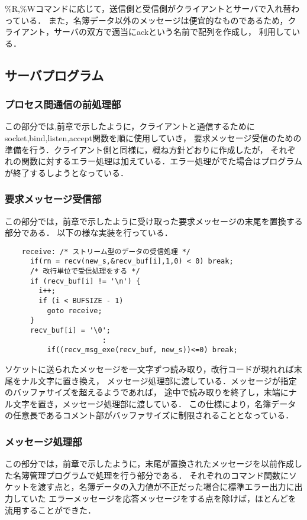 \documentclass[a4paper,11pt]{jarticle}
\begin{document}
\%R,\%Wコマンドに応じて，送信側と受信側がクライアントとサーバで入れ替わっている．
また，名簿データ以外のメッセージは便宜的なものであるため，クライアント，サーバの双方で適当にackという名前で配列を作成し，
利用している．

\subsection{サーバプログラム}
\subsubsection{プロセス間通信の前処理部} \label{sec:pre}
この部分では,前章で示したように，クライアントと通信するためにsocket,bind,listen,accept関数を順に使用していき，
要求メッセージ受信のための準備を行う．クライアント側と同様に，概ね方針どおりに作成したが，
それぞれの関数に対するエラー処理は加えている．エラー処理がでた場合はプログラムが終了するしようとなっている．
\subsubsection{要求メッセージ受信部} \label{sec:pre}
この部分では，前章で示したように受け取った要求メッセージの末尾を置換する部分である．
以下の様な実装を行っている．
\begin{verbatim}
	receive: /* ストリーム型のデータの受信処理 */  
	  if(rn = recv(new_s,&recv_buf[i],1,0) < 0) break;
	  /* 改行単位で受信処理をする */
	  if (recv_buf[i] != '\n') {
	    i++;
	    if (i < BUFSIZE - 1)
	      goto receive;
	  }
	  recv_buf[i] = '\0';
                       :
          if((recv_msg_exe(recv_buf, new_s))<=0) break;
\end{verbatim}
ソケットに送られたメッセージを一文字ずつ読み取り，改行コードが現れれば末尾をナル文字に置き換え，
メッセージ処理部に渡している．メッセージが指定のバッファサイズを超えるようであれば，
途中で読み取りを終了し，末端にナル文字を置き，メッセージ処理部に渡している．
この仕様により，名簿データの任意長であるコメント部がバッファサイズに制限されることとなっている．
\subsubsection{メッセージ処理部} \label{sec:pre}
この部分では，前章で示したように，末尾が置換されたメッセージを以前作成した名簿管理プログラムで処理を行う部分である．
それぞれのコマンド関数にソケットを渡す点と，名簿データの入力値が不正だった場合に標準エラー出力に出力していた
エラーメッセージを応答メッセージをする点を除けば，ほとんどを流用することができた．
\end{document}
